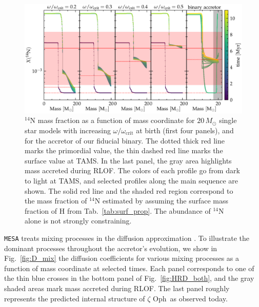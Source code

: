 \documentclass[twocolumn,twocolappendix,trackchanges]{aastex63}
\DeclareRobustCommand{\Figref}[1]{Fig.~\ref{#1}}
\DeclareRobustCommand{\Tabref}[1]{Tab.~\ref{#1}}
\newcommand{\zoph}{$\zeta$ Oph}
\begin{document}
\begin{figure}[htbp]
  \centering
  \includegraphics[width=\textwidth]{n14_struct_complete_zeta_ab}
  \caption{$^{14}\mathrm{N}$ mass fraction as a function of mass
    coordinate for $20\,M_\odot$ single star models with increasing
    $\omega/\omega_\mathrm{crit}$ at birth (first four panels), and
    for the accretor of our fiducial binary. The dotted thick red line
    marks the primordial value, the thin dashed red line marks the
    surface value at TAMS. In the last panel, the gray area highlights
    mass accreted during RLOF. The colors of each profile go from dark to
    light at TAMS, and selected profiles along the main sequence are
    shown. The solid red line and the shaded red region correspond to the
    mass fraction of $^{14}\mathrm{N}$ estimated by
     assuming the surface mass fraction of H
    from \Tabref{tab:surf_prop}. The abundance of $^{14}\mathrm{N}$ alone is not strongly constraining.}
  \label{fig:n14}
\end{figure}


\texttt{MESA} treats mixing processes in the diffusion approximation
\citep{paxton:11}.  To illustrate the dominant processes throughout
the accretor's evolution, we show in \Figref{fig:D_mix} the diffusion
coefficients for various mixing processes as a function of mass
coordinate at selected times. Each panel corresponds to one of the
thin blue crosses in the bottom panel of \Figref{fig:HRD_both}, and
the gray shaded areas mark mass accreted during RLOF. The last
panel roughly represents the predicted internal structure of \zoph\ as
observed today.
\end{document}
